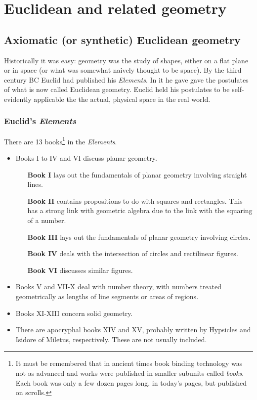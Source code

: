 \chapter{Euclidean and related geometry}
\section{Axiomatic (or synthetic) Euclidean geometry}
Historically it was easy: geometry was the study of shapes, either on a flat plane or in space (or what was somewhat naively thought to be space). By the third century BC Euclid had published his \textit{Elements}. In it he gave gave the postulates of what is now called Euclidean geometry. Euclid held his postulates to be self-evidently applicable the the actual, physical space in the real world.

\subsection{Euclid's \textit{Elements}}
There are 13 books\footnote{It must be remembered that in ancient times book binding technology was not as advanced and works were published in smaller subunits called \textit{books}. Each book was only a few dozen pages long, in today's pages, but published on scrolls.} in the \textit{Elements}.
\begin{itemize}
\item Books I to IV and VI discuss planar geometry.
\begin{itemize}
\item[\textbf{Book I}] lays out the fundamentals of planar geometry involving straight lines.
\item[\textbf{Book II}] contains propositions to do with squares and rectangles. This has a strong link with geometric algebra due to the link with the squaring of a number.  
\item[\textbf{Book III}] lays out the fundamentals of planar geometry involving circles.
\item[\textbf{Book IV}] deals with the intersection of circles and rectilinear figures.
\item[\textbf{Book VI}] discusses similar figures.
\end{itemize}
\item  Books V and VII-X deal with number theory, with numbers treated geometrically as lengths of line segments or areas of regions.
\item Books XI-XIII concern solid geometry.
\item There are apocryphal books XIV and XV, probably written by Hypsicles and Isidore of Miletus, respectively. These are not usually included.
\end{itemize}

